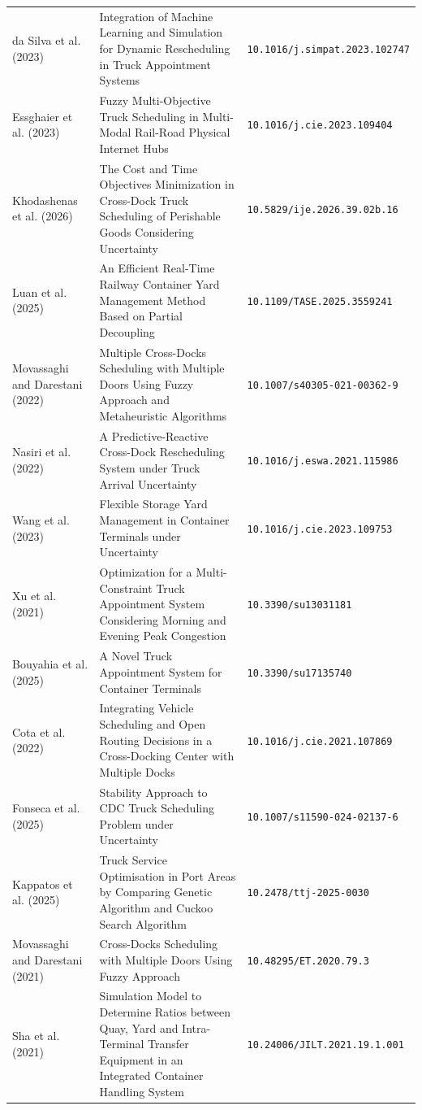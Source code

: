 \documentclass[preprint,12pt,number,longtitle]{elsarticle}
\begin{document}
\begin{longtable}{>{\raggedright\arraybackslash}p{} >{\raggedright\arraybackslash}p{} >{\raggedright\arraybackslash}p{}}
da Silva et al. (2023) & Integration of Machine Learning and Simulation for Dynamic Rescheduling in Truck Appointment Systems & \nolinkurl{10.1016/j.simpat.2023.102747} \\
Essghaier et al. (2023) & Fuzzy Multi-Objective Truck Scheduling in Multi-Modal Rail-Road Physical Internet Hubs & \nolinkurl{10.1016/j.cie.2023.109404} \\
Khodashenas et al. (2026) & The Cost and Time Objectives Minimization in Cross-Dock Truck Scheduling of Perishable Goods Considering Uncertainty & \nolinkurl{10.5829/ije.2026.39.02b.16} \\
Luan et al. (2025) & An Efficient Real-Time Railway Container Yard Management Method Based on Partial Decoupling & \nolinkurl{10.1109/TASE.2025.3559241} \\
Movassaghi and Darestani (2022) & Multiple Cross-Docks Scheduling with Multiple Doors Using Fuzzy Approach and Metaheuristic Algorithms & \nolinkurl{10.1007/s40305-021-00362-9} \\
Nasiri et al. (2022) & A Predictive-Reactive Cross-Dock Rescheduling System under Truck Arrival Uncertainty & \nolinkurl{10.1016/j.eswa.2021.115986} \\
Wang et al. (2023) & Flexible Storage Yard Management in Container Terminals under Uncertainty & \nolinkurl{10.1016/j.cie.2023.109753} \\
Xu et al. (2021) & Optimization for a Multi-Constraint Truck Appointment System Considering Morning and Evening Peak Congestion & \nolinkurl{10.3390/su13031181} \\
Bouyahia et al. (2025) & A Novel Truck Appointment System for Container Terminals & \nolinkurl{10.3390/su17135740} \\
Cota et al. (2022) & Integrating Vehicle Scheduling and Open Routing Decisions in a Cross-Docking Center with Multiple Docks & \nolinkurl{10.1016/j.cie.2021.107869} \\
Fonseca et al. (2025) & Stability Approach to {{CDC}} Truck Scheduling Problem under Uncertainty & \nolinkurl{10.1007/s11590-024-02137-6} \\
Kappatos et al. (2025) & Truck Service Optimisation in Port Areas by Comparing Genetic Algorithm and Cuckoo Search Algorithm & \nolinkurl{10.2478/ttj-2025-0030} \\
Movassaghi and Darestani (2021) & Cross-Docks Scheduling with Multiple Doors Using Fuzzy Approach & \nolinkurl{10.48295/ET.2020.79.3} \\
Sha et al. (2021) & Simulation Model to Determine Ratios between Quay, Yard and Intra-Terminal Transfer Equipment in an Integrated Container Handling System & \nolinkurl{10.24006/JILT.2021.19.1.001} \\

\end{longtable}
\end{document}
